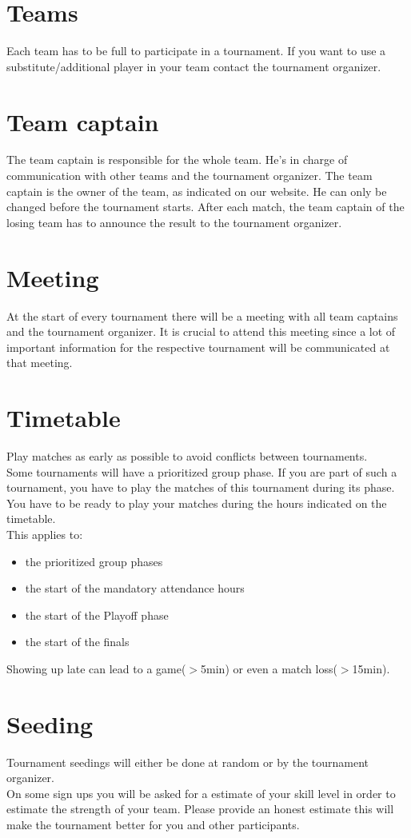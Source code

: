 \documentclass{article}
\begin{document}
\section{Teams}
Each team has to be full to participate in a tournament. If you want to use a substitute/additional player in your team contact the tournament organizer.

\section{Team captain}
The team captain is responsible for the whole team. He’s in charge of
communication with other teams and the tournament organizer.
The team captain is the owner of the team, as indicated on our website.
He can only be changed before the tournament starts. After each match, the team captain of the losing team has to announce the result to the tournament organizer.


\section{Meeting}
At the start of every tournament there will be a meeting with all team captains and the tournament organizer. It is crucial to attend this meeting since a lot of important information for the respective tournament will be communicated at that meeting.


\section{Timetable}
Play matches as early as possible to avoid conflicts between tournaments.\\
Some tournaments will have a prioritized group phase. If you are part of such a tournament, you have to play the matches of this tournament during its phase.
You have to be ready to play your matches during the hours indicated on the timetable.\\
This applies to:
\begin{itemize}
	\item the prioritized group phases
	\item the start of the mandatory attendance hours
	\item the start of the Playoff phase
	\item the start of the finals
\end{itemize}
Showing up late can lead to a game($>$5min) or even a match loss($>$15min).


\section{Seeding}
Tournament seedings will either be done at random or by the tournament organizer.\\
On some sign ups you will be asked for a estimate of your skill level in order to estimate the strength of your team.
Please provide an honest estimate this will make the tournament better for you and other participants.
\end{document}
